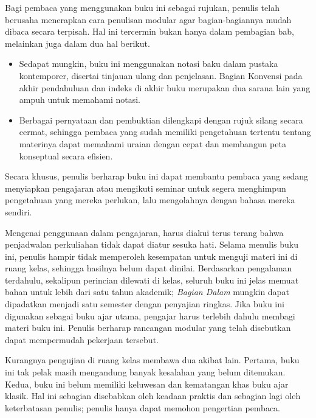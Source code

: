 Bagi pembaca yang menggunakan buku ini sebagai rujukan, penulis telah
berusaha menerapkan cara penulisan modular agar bagian-bagiannya mudah
dibaca secara terpisah. Hal ini tercermin bukan hanya dalam pembagian bab,
melainkan juga dalam dua hal berikut.
\begin{itemize}
	\item Sedapat mungkin, buku ini menggunakan notasi baku dalam pustaka
	kontemporer, disertai tinjauan ulang dan penjelasan. Bagian Konvensi pada
	akhir pendahuluan dan indeks di akhir buku merupakan dua sarana lain yang
	ampuh untuk memahami notasi.
	\item Berbagai pernyataan dan pembuktian dilengkapi dengan rujuk silang
	secara cermat, sehingga pembaca yang sudah memiliki pengetahuan tertentu
	tentang materinya dapat memahami uraian dengan cepat dan membangun peta
	konseptual secara efisien.
\end{itemize}

Secara khusus, penulis berharap buku ini dapat membantu pembaca yang sedang
menyiapkan pengajaran atau mengikuti seminar untuk segera menghimpun
pengetahuan yang mereka perlukan, lalu mengolahnya dengan bahasa mereka sendiri.

Mengenai penggunaan dalam pengajaran, harus diakui terus terang bahwa
penjadwalan perkuliahan tidak dapat diatur sesuka hati. Selama menulis
buku ini, penulis hampir tidak memperoleh kesempatan untuk menguji materi
ini di ruang kelas, sehingga hasilnya belum dapat dinilai. Berdasarkan
pengalaman terdahulu, sekalipun perincian dilewati di kelas, seluruh buku
ini jelas memuat bahan untuk lebih dari satu tahun akademik; \emph{Bagian Dalam}
mungkin dapat dipadatkan menjadi satu semester dengan penyajian ringkas. Jika
buku ini digunakan sebagai buku ajar utama, pengajar harus terlebih dahulu
membagi materi buku ini. Penulis berharap rancangan modular yang telah disebutkan
dapat mempermudah pekerjaan tersebut.

Kurangnya pengujian di ruang kelas membawa dua akibat lain. Pertama, buku
ini tak pelak masih mengandung banyak kesalahan yang belum ditemukan.
Kedua, buku ini belum memiliki keluwesan dan kematangan khas buku ajar
klasik. Hal ini sebagian disebabkan oleh keadaan praktis dan sebagian lagi
oleh keterbatasan penulis; penulis hanya dapat memohon pengertian
pembaca.


